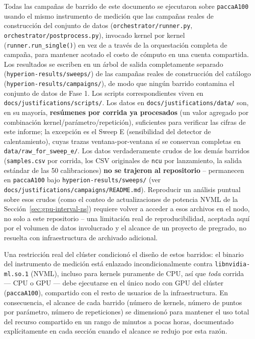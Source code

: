 \documentclass[11pt]{article}
\begin{document}
Todas las campañas de barrido de este documento se ejecutaron sobre
\texttt{paccaA100} usando el mismo instrumento de medición que las campañas
reales de construcción del conjunto de datos (\texttt{orchestrator/runner.py},
\texttt{orchestrator/postprocess.py}), invocado kernel por kernel
(\texttt{runner.run\_single()}) en vez de a través de la orquestación completa
de campaña, para mantener acotado el costo de cómputo en una cuenta
compartida. Los resultados se escriben en un árbol de salida completamente
separado (\texttt{hyperion-results/sweeps/}) de las campañas reales de
construcción del catálogo (\texttt{hyperion-results/campaigns/}), de modo
que ningún barrido contamina el conjunto de datos de Fase 1. Los scripts
correspondientes viven en \texttt{docs/justifications/scripts/}. Los datos
en \texttt{docs/justifications/data/} son, en su mayoría, \textbf{resúmenes
por corrida ya procesados} (un valor agregado por combinación
kernel/parámetro/repetición), suficientes para verificar las cifras de
este informe; la excepción es el Sweep E (sensibilidad del detector de
calentamiento), cuyas trazas ventana-por-ventana sí se conservan completas
en \texttt{data/raw\_for\_sweep\_e/}. Los datos verdaderamente crudos de
los demás barridos (\texttt{samples.csv} por corrida, los CSV originales
de \texttt{ncu} por lanzamiento, la salida estándar de las 50
calibraciones) \textbf{no se trajeron al repositorio} -- permanecen en
\texttt{paccaA100} bajo \texttt{hyperion-results/sweeps/} (ver
\texttt{docs/justifications/campaigns/README.md}). Reproducir un análisis puntual sobre esos crudos (como el conteo de
actualizaciones de potencia NVML de la Sección~\ref{sec:gpu-interval-ns})
requiere volver a acceder a esos archivos en el nodo, no solo a este
repositorio -- una limitación real de reproducibilidad, aceptada aquí por
el volumen de datos involucrado y el alcance de un proyecto de pregrado,
no resuelta con infraestructura de archivado adicional.

Una restricción real del clúster condicionó el diseño de estos barridos: el
binario del instrumento de medición está enlazado incondicionalmente contra
\texttt{libnvidia-ml.so.1} (NVML), incluso para kernels puramente de CPU, así
que \emph{toda} corrida --- CPU o GPU --- debe ejecutarse en el único nodo
con GPU del clúster (\texttt{paccaA100}), compartido con el resto de usuarios
de la infraestructura. En consecuencia, el alcance de cada barrido (número de
kernels, número de puntos por parámetro, número de repeticiones) se
dimensionó para mantener el uso total del recurso compartido en un rango de
minutos a pocas horas, documentado explícitamente en cada sección cuando el
alcance se redujo por esta razón.
\end{document}

